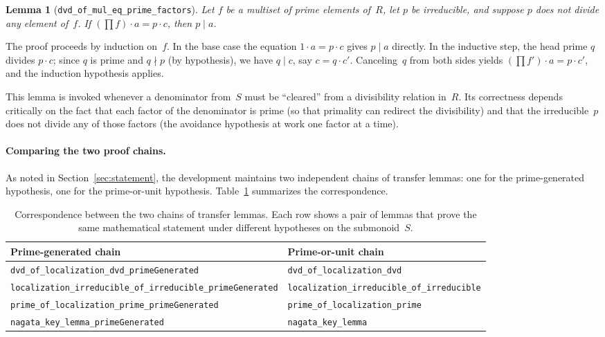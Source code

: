 \documentclass[11pt]{article}
\theoremstyle{plain}
\newtheorem{lemma}[theorem]{Lemma}
\theoremstyle{definition}
\theoremstyle{remark}
\newcommand{\li}[1]{\texorpdfstring{\texttt{#1}}{#1}}
\begin{document}
\begin{lemma}[\li{dvd\_of\_mul\_eq\_prime\_factors}]\label{lem:clear-denom}
Let $f$ be a multiset of prime elements of~$R$, let $p$ be irreducible, and
suppose $p$ does not divide any element of~$f$.  If\/ $(\prod f)\cdot a =
p\cdot c$, then $p\mid a$.
\end{lemma}

\noindent
The proof proceeds by induction on~$f$.  In the base case the equation
$1\cdot a = p\cdot c$ gives $p\mid a$ directly.  In the inductive step, the
head prime $q$ divides $p\cdot c$; since $q$ is prime and $q\nmid p$
(by hypothesis), we have $q\mid c$, say $c=q\cdot c'$.  Canceling~$q$ from
both sides yields $(\prod f')\cdot a = p\cdot c'$, and the induction
hypothesis applies.

This lemma is invoked whenever a denominator from~$S$ must be ``cleared''
from a divisibility relation in~$R$.  Its correctness depends critically on
the fact that each factor of the denominator is prime (so that primality can
redirect the divisibility) and that the irreducible~$p$ does not divide any of
those factors (the avoidance hypothesis at work one factor at a time).

\paragraph{Comparing the two proof chains.}
As noted in Section~\ref{sec:statement}, the development maintains two
independent chains of transfer lemmas: one for the prime-generated hypothesis,
one for the prime-or-unit hypothesis.  Table~\ref{tab:chains} summarizes the
correspondence.

\begin{table}[ht]
\centering
\caption{Correspondence between the two chains of transfer lemmas.  Each row
shows a pair of lemmas that prove the same mathematical statement under
different hypotheses on the submonoid~$S$.}\label{tab:chains}
\smallskip
{\small
\begin{tabular}{@{}>{\raggedright\arraybackslash}p{6.4cm}>{\raggedright\arraybackslash}p{5.4cm}@{}}
\toprule
\textbf{Prime-generated chain} & \textbf{Prime-or-unit chain} \\
\midrule
\li{dvd\_of\_localization\_dvd\_\allowbreak{}primeGenerated}
  & \li{dvd\_of\_localization\_dvd} \\[3pt]
\li{localization\_irreducible\_\allowbreak{}of\_irreducible\_primeGenerated}
  & \li{localization\_irreducible\_\allowbreak{}of\_irreducible} \\[3pt]
\li{prime\_of\_localization\_prime\_\allowbreak{}primeGenerated}
  & \li{prime\_of\_localization\_\allowbreak{}prime} \\[3pt]
\li{nagata\_key\_lemma\_\allowbreak{}primeGenerated}
  & \li{nagata\_key\_lemma} \\
\bottomrule
\end{tabular}
}
\end{table}
\end{document}
